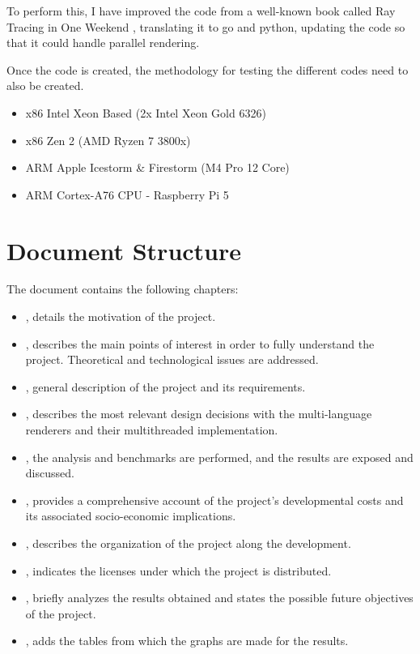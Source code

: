 To perform this, I have improved the code from a well-known book called Ray Tracing in One Weekend
\cite{Shirley2016RTW1}, translating it to go and python, updating the code so that it could handle parallel rendering. 

Once the code is created, the methodology for testing the different codes need to also be created. \begin{itemize}
    \item x86 Intel Xeon Based (2x Intel Xeon Gold 6326)
    \item x86 Zen 2 (AMD Ryzen 7 3800x)
    \item ARM Apple Icestorm \& Firestorm (M4 Pro 12 Core)
    \item ARM Cortex-A76 CPU - Raspberry Pi 5
\end{itemize} 

\section{Document Structure}\label{sec:structure}
The document contains the following chapters:
\begin{itemize}
  \item {}, details the motivation of the project.
  \item {}, describes the main points of interest in order to
fully understand the project. Theoretical and technological issues are addressed.
  \item {}, general description of the project and its requirements.
  \item {}, describes the most relevant design decisions with the multi-language renderers and their multithreaded implementation.
  \item {}, the analysis and benchmarks are performed, and the results are exposed and discussed.
  \item {}, provides a comprehensive account of the project's developmental costs and its associated socio-economic implications.
  \item {}, describes the organization of the project along the development.
  \item {}, indicates the licenses under which the project is distributed.
  \item {}, briefly analyzes the results obtained and states the possible future objectives of the project.
  \item {}, adds the tables from which the graphs are made for the results.
\end{itemize}

